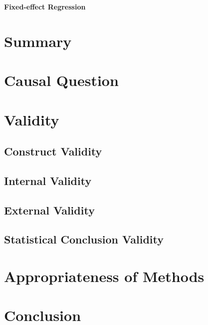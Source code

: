 \begin{center}
    \textbf{Fixed-effect Regression}
\end{center}

\begin{hangparas}{0.5in}{1}
\end{hangparas}

\section{Summary}

\textcite{white:2013}

\section{Causal Question}

\section{Validity}

\subsection{Construct Validity}

\subsection{Internal Validity}

\subsection{External Validity}

\subsection{Statistical Conclusion Validity}

\section{Appropriateness of Methods}

\section{Conclusion}
